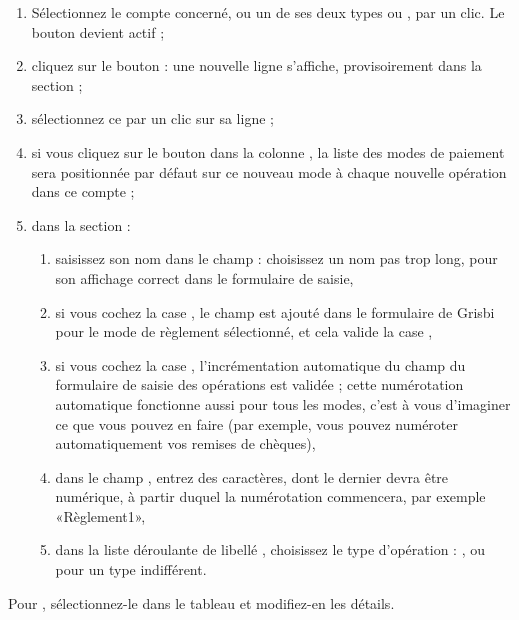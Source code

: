 \begin{enumerate}
	\item Sélectionnez le compte concerné, ou un de ses deux types  ou  , par un clic. Le bouton  devient actif ;
	\item cliquez sur le bouton  : une nouvelle ligne  s'affiche, provisoirement dans la section  ;
	\item sélectionnez ce  par un clic sur sa ligne ;
	\item si vous cliquez sur le bouton dans la colonne  , la liste des modes de paiement sera positionnée par défaut sur ce nouveau mode à chaque nouvelle opération dans ce compte ;
	\item dans la section  :
		\begin{enumerate}
			\item saisissez son nom dans le champ  : choisissez un nom pas trop long, pour son affichage correct dans le formulaire de saisie,
			\item si vous cochez la case , le champ  est ajouté dans le formulaire de Grisbi pour le mode de règlement sélectionné, et cela valide la case ,
			\item si vous cochez la case , l'incrémentation automatique du champ  du formulaire de saisie des opérations est validée ; cette numérotation automatique fonctionne aussi pour tous les modes, c'est à vous d'imaginer ce que vous pouvez en faire (par exemple, vous pouvez numéroter automatiquement vos remises de chèques),
			\item dans le champ , entrez des caractères, dont le dernier devra être numérique, à partir duquel la numérotation commencera, par exemple «Règlement1»,
			\item dans la liste déroulante de libellé  , choisissez le type d'opération : ,  ou  pour un type indifférent.
		\end{enumerate}
\end{enumerate}

\ifIllustration
\else
\fi

Pour , sélectionnez-le dans le tableau  et modifiez-en les détails.

